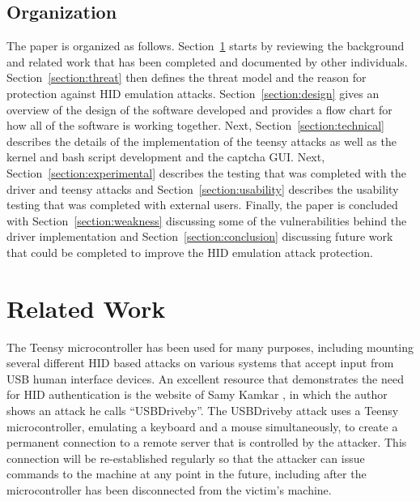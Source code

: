 \documentclass[pagenumbers]{ieee}
\begin{document}

\subsection{Organization}
\label{section:organization}

The paper is organized as follows. Section~\ref{section:related} starts by reviewing the background and related work that has been completed and documented by other individuals. Section~\ref{section:threat} then defines the threat model and the reason for protection against HID emulation attacks. Section~\ref{section:design} gives an overview of the design of the software developed and provides a flow chart for how all of the software is working together. Next, Section~\ref{section:technical} describes the details of the implementation of the teensy attacks as well as the kernel and bash script development and the captcha GUI. Next, Section~\ref{section:experimental} describes the testing that was completed with the driver and teensy attacks and Section~\ref{section:usability} describes the usability testing that was completed with external users. Finally, the paper is concluded with Section~\ref{section:weakness} discussing some of the vulnerabilities behind the driver implementation and Section~\ref{section:conclusion} discussing future work that could be completed to improve the HID emulation attack protection.


\section{Related Work}
\label{section:related}

The Teensy microcontroller has been used for many purposes, including mounting several different HID based attacks on various systems that accept input from USB human interface devices. An excellent resource that demonstrates the need for HID authentication is the website of Samy Kamkar \cite{samy}, in which the author shows an attack he calls ``USBDriveby''. The USBDriveby attack uses a Teensy microcontroller, emulating a keyboard and a mouse simultaneously,  to create a permanent connection to a remote server that is controlled by the attacker.  This connection will be re-established regularly so that the attacker can issue commands to the machine at any point in the future, including after the microcontroller has been disconnected from the victim's machine.
\end{document}
